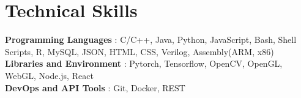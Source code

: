 \documentclass[letterpaper,11pt]{article}
\newcommand{\sectionspace}{
\vspace{-20pt}
}
\newcommand{\subheadingtitlevspace}{
\vspace{-3pt}
}
\newcommand{\titleItem}[1]{
  \textbf{#1}
}
\begin{document}

\section{Technical Skills}
\subheadingtitlevspace
 \begin{itemize}[leftmargin=0.15in, label={}]
    {\item{
      \titleItem{Programming Languages}{: C/C++, Java, Python, JavaScript, Bash, Shell Scripts, R, MySQL, JSON, HTML, CSS, Verilog, Assembly(ARM, x86)} \\
      \titleItem{Libraries and Environment}{: Pytorch, Tensorflow, OpenCV, OpenGL, WebGL, Node.js, React} \\
      \titleItem{DevOps and API Tools}{: Git, Docker, REST} \\
    }}
 \end{itemize}
\sectionspace



\end{document}

